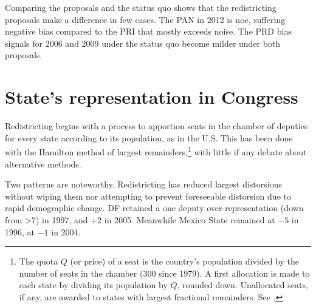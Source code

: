 \documentclass[letter,12pt]{article}
\begin{document}
Comparing the proposals and the status quo shows that the redistricting proposals make a difference in few cases. The PAN in 2012 is noe, suffering negative bias compared to the PRI that mostly exceeds noise. The PRD bias signals for 2006 and 2009 under the status quo become milder under both proposals.   

\section{State's representation in Congress}

Redistricting begins with a process to apportion seats in the chamber of deputies for every state according to its population, as in the U.S. This has been done with the Hamilton method of largest remainders,\footnote{The quota $Q$ (or price) of a seat is the country's population divided by the number of seats in the chamber (300 since 1979). A first allocation is made to each state by dividing its population by $Q$, rounded down. Unallocated seats, if any, are awarded to states with largest fractional remainders. See \citet{balinskiYoung2001FairRep}.} with little if any debate about alternative methods. 

Two patterns are noteworthy. Redistricting has reduced largest distorsions without wiping them nor attempting to prevent foreseeable distorsion due to rapid demographic change. DF retained a one deputy over-representation (down from >7) in 1997, and +2 in 2005. Meanwhile Mexico State remained at $-5$ in 1996, at $-1$ in 2004.   
\end{document}
